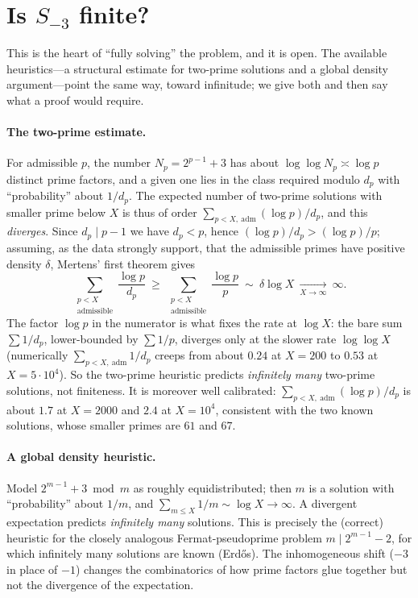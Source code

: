 \documentclass[11pt,reqno]{amsart}
\theoremstyle{plain}
\theoremstyle{definition}
\theoremstyle{remark}
\begin{document}
\section{Is \texorpdfstring{$S_{-3}$}{S(-3)} finite?}\label{sec:finite}

This is the heart of ``fully solving'' the problem, and it is open. The available heuristics---a
structural estimate for two-prime solutions and a global density argument---point the same way,
toward infinitude; we give both and then say what a proof would require.

\paragraph{The two-prime estimate.}
For admissible $p$, the number $N_{p}=2^{p-1}+3$ has about $\log\log N_{p}\asymp\log p$ distinct
prime factors, and a given one lies in the class required modulo $d_{p}$ with ``probability''
about $1/d_{p}$. The expected number of two-prime solutions with smaller prime below $X$ is thus
of order $\sum_{p<X,\ \mathrm{adm}}(\log p)/d_{p}$, and this \emph{diverges}. Since $d_{p}\mid p-1$
we have $d_{p}<p$, hence $(\log p)/d_{p}>(\log p)/p$; assuming, as the data strongly support, that
the admissible primes have positive density $\delta$, Mertens' first theorem gives
\[
\sum_{\substack{p<X\\\text{admissible}}}\frac{\log p}{d_{p}}\ \ge\
\sum_{\substack{p<X\\\text{admissible}}}\frac{\log p}{p}\ \sim\ \delta\log X\ \xrightarrow[X\to\infty]{}\ \infty .
\]
The factor $\log p$ in the numerator is what fixes the rate at $\log X$: the bare sum $\sum
1/d_{p}$, lower-bounded by $\sum 1/p$, diverges only at the slower rate $\log\log X$ (numerically
$\sum_{p<X,\ \mathrm{adm}}1/d_{p}$ creeps from about $0.24$ at $X=200$ to $0.53$ at $X=5\cdot
10^{4}$). So the two-prime heuristic predicts \emph{infinitely many} two-prime solutions, not
finiteness. It is moreover well calibrated: $\sum_{p<X,\ \mathrm{adm}}(\log p)/d_{p}$ is about
$1.7$ at $X=2000$ and $2.4$ at $X=10^{4}$, consistent with the two known solutions, whose smaller
primes are $61$ and $67$.

\paragraph{A global density heuristic.}
Model $2^{m-1}+3\bmod m$ as roughly equidistributed; then $m$ is a solution with ``probability''
about $1/m$, and $\sum_{m\le X}1/m\sim\log X\to\infty$. A divergent expectation predicts
\emph{infinitely many} solutions. This is precisely the (correct) heuristic for the closely
analogous Fermat-pseudoprime problem $m\mid 2^{m-1}-2$, for which infinitely many solutions are
known (Erd\H{o}s). The inhomogeneous shift ($-3$ in place of $-1$) changes the combinatorics of
how prime factors glue together but not the divergence of the expectation.
\end{document}

